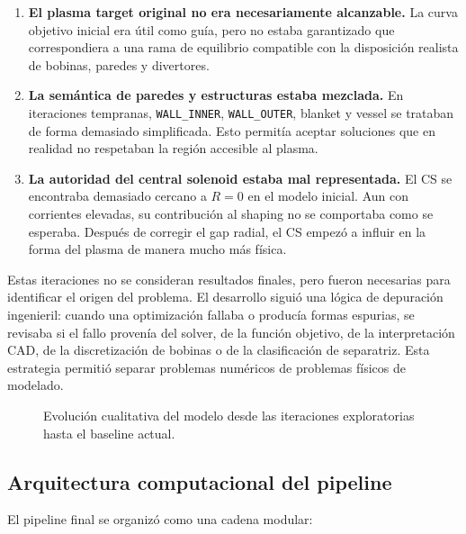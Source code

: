 \documentclass[11pt,a4paper]{article}
\begin{document}
\begin{enumerate}
    \item \textbf{El plasma target original no era necesariamente alcanzable.} La curva objetivo
    inicial era útil como guía, pero no estaba garantizado que correspondiera a una rama de
    equilibrio compatible con la disposición realista de bobinas, paredes y divertores.

    \item \textbf{La semántica de paredes y estructuras estaba mezclada.} En iteraciones tempranas,
    \texttt{WALL\_INNER}, \texttt{WALL\_OUTER}, blanket y vessel se trataban de forma demasiado
    simplificada. Esto permitía aceptar soluciones que en realidad no respetaban la región
    accesible al plasma.

    \item \textbf{La autoridad del central solenoid estaba mal representada.} El CS se encontraba
    demasiado cercano a $R=0$ en el modelo inicial. Aun con corrientes elevadas, su contribución
    al shaping no se comportaba como se esperaba. Después de corregir el gap radial, el CS empezó
    a influir en la forma del plasma de manera mucho más física.
\end{enumerate}

Estas iteraciones no se consideran resultados finales, pero fueron necesarias para identificar
el origen del problema. El desarrollo siguió una lógica de depuración ingenieril: cuando una
optimización fallaba o producía formas espurias, se revisaba si el fallo provenía del solver,
de la función objetivo, de la interpretación CAD, de la discretización de bobinas o de la
clasificación de separatriz. Esta estrategia permitió separar problemas numéricos de problemas
físicos de modelado.

\begin{figure}[htbp]
\centering
{}
\caption{Evolución cualitativa del modelo desde las iteraciones exploratorias hasta el baseline actual.}
\label{fig:star_model_evolution_placeholder}
\end{figure}

\subsection{Arquitectura computacional del pipeline}
El pipeline final se organizó como una cadena modular:
\end{document}
